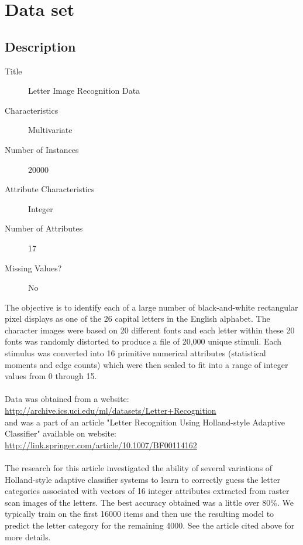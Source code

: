 \chapter*{Data set}
\section*{Description}
\begin{description}
\item[Title] Letter Image Recognition Data
\item[Characteristics]  Multivariate
\item[Number of Instances] 20000
\item[Attribute Characteristics] Integer
\item[Number of Attributes] 17
\item[Missing Values?] No
\end{description}

The objective is to identify each of a large number of black-and-white rectangular
pixel displays as one of the 26 capital letters in the English alphabet. The
character images were based on 20 different fonts and each letter within these
20 fonts was randomly distorted to produce a file of 20,000 unique stimuli.
Each stimulus was converted into 16 primitive numerical attributes (statistical
moments and edge counts) which were then scaled to fit into a range of integer
values from 0 through 15. \\
\\
\noindent
Data was obtained from a website: \\
\url{http://archive.ics.uci.edu/ml/datasets/Letter+Recognition} \\
and was a part of an article "Letter Recognition Using Holland-style Adaptive
Classifier" available on website: \\
\url{http://link.springer.com/article/10.1007/BF00114162} \\
\\
\noindent
The research for this article investigated the ability of several
variations of Holland-style adaptive classifier systems to learn to
correctly guess the letter categories associated with vectors of 16
integer attributes extracted from raster scan images of the letters.
The best accuracy obtained was a little over 80\%.
We typically train on the first 16000 items and then use the resulting model
to predict the letter category for the remaining 4000. See the article cited
above for more details.

